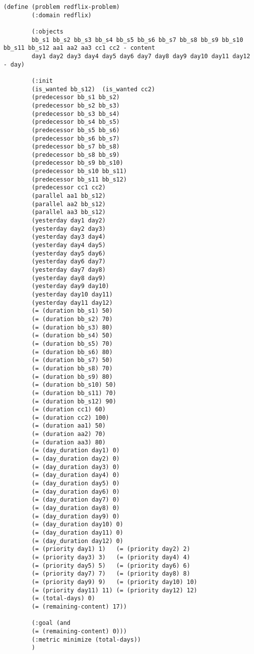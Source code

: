 \documentclass[a4paper]{article}
\begin{document}
	
	\begin{lstlisting}[language=PDDL, caption={Joc de Prova 1 - Extensió 4
		}, label={lst:JP14}]                     
		(define (problem redflix-problem)
		(:domain redflix)
		
		(:objects
		bb_s1 bb_s2 bb_s3 bb_s4 bb_s5 bb_s6 bb_s7 bb_s8 bb_s9 bb_s10 bb_s11 bb_s12 aa1 aa2 aa3 cc1 cc2 - content
		day1 day2 day3 day4 day5 day6 day7 day8 day9 day10 day11 day12 - day)
		
		(:init
		(is_wanted bb_s12)	(is_wanted cc2)
		(predecessor bb_s1 bb_s2)
		(predecessor bb_s2 bb_s3)
		(predecessor bb_s3 bb_s4)
		(predecessor bb_s4 bb_s5)
		(predecessor bb_s5 bb_s6)
		(predecessor bb_s6 bb_s7)
		(predecessor bb_s7 bb_s8)
		(predecessor bb_s8 bb_s9)
		(predecessor bb_s9 bb_s10)
		(predecessor bb_s10 bb_s11)
		(predecessor bb_s11 bb_s12)
		(predecessor cc1 cc2)
		(parallel aa1 bb_s12)
		(parallel aa2 bb_s12)
		(parallel aa3 bb_s12)
		(yesterday day1 day2)
		(yesterday day2 day3)
		(yesterday day3 day4)
		(yesterday day4 day5)
		(yesterday day5 day6)
		(yesterday day6 day7)
		(yesterday day7 day8)
		(yesterday day8 day9)
		(yesterday day9 day10)
		(yesterday day10 day11)
		(yesterday day11 day12)
		(= (duration bb_s1) 50)
		(= (duration bb_s2) 70)
		(= (duration bb_s3) 80)
		(= (duration bb_s4) 50)
		(= (duration bb_s5) 70)
		(= (duration bb_s6) 80)
		(= (duration bb_s7) 50)
		(= (duration bb_s8) 70)
		(= (duration bb_s9) 80)
		(= (duration bb_s10) 50)
		(= (duration bb_s11) 70)
		(= (duration bb_s12) 90)
		(= (duration cc1) 60)
		(= (duration cc2) 100)
		(= (duration aa1) 50)
		(= (duration aa2) 70)
		(= (duration aa3) 80)
		(= (day_duration day1) 0)
		(= (day_duration day2) 0)
		(= (day_duration day3) 0)
		(= (day_duration day4) 0)
		(= (day_duration day5) 0)
		(= (day_duration day6) 0)
		(= (day_duration day7) 0)
		(= (day_duration day8) 0)
		(= (day_duration day9) 0)
		(= (day_duration day10) 0)
		(= (day_duration day11) 0)
		(= (day_duration day12) 0)
		(= (priority day1) 1)	(= (priority day2) 2)
		(= (priority day3) 3)   (= (priority day4) 4)
		(= (priority day5) 5)   (= (priority day6) 6)
		(= (priority day7) 7)   (= (priority day8) 8)
		(= (priority day9) 9)   (= (priority day10) 10)
		(= (priority day11) 11) (= (priority day12) 12)
		(= (total-days) 0)
		(= (remaining-content) 17))
		
		(:goal (and
		(= (remaining-content) 0)))
		(:metric minimize (total-days))
		)
		
		
	\end{lstlisting}
	
\end{document}
